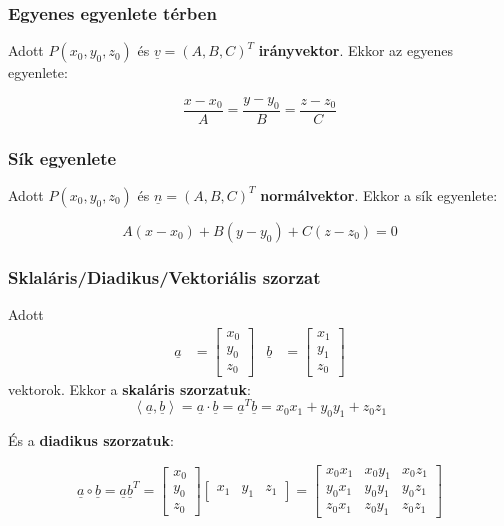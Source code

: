 \documentclass{article}
\begin{document}
\subsubsection{Egyenes egyenlete térben}
    Adott $P(x_0, y_0, z_0)$ és $\underline{v} = \left( A, B, C \right)^T$ \textbf{irányvektor}. Ekkor az egyenes egyenlete:

\begin{equation*}
    \frac{x-x_0}{A} = \frac{y-y_0}{B} = \frac{z-z_0}{C}
\end{equation*}

\subsubsection{Sík egyenlete}
    Adott $P(x_0, y_0, z_0)$ és $\underline{n} = \left( A, B, C \right)^T$ \textbf{normálvektor}. Ekkor a sík egyenlete:

\begin{equation*}
    A(x-x_0) + B(y-y_0) + C(z-z_0) = 0
\end{equation*}

\subsubsection{Sklaláris/Diadikus/Vektoriális szorzat}
Adott 
\begin{align*}
    \underline{a} &= \begin{bmatrix} x_0 \\ y_0 \\ z_0 \end{bmatrix} &
    \underline{b} &= \begin{bmatrix} x_1 \\ y_1 \\ z_0 \end{bmatrix}
\end{align*}
vektorok. Ekkor a \textbf{skaláris szorzatuk}:
\begin{equation*}
    \left\langle \underline{a}, \underline{b} \right\rangle = \underline{a} \cdot \underline{b} = \underline{a}^T\underline{b} = x_0x_1 + y_0y_1 + z_0z_1
\end{equation*}

\newpage

És a \textbf{diadikus szorzatuk}:

\begin{equation*}
    \underline{a} \circ \underline{b} = \underline{a}\underline{b}^T = \begin{bmatrix} x_0 \\ y_0 \\ z_0 \end{bmatrix} \begin{bmatrix} x_1 & y_1 & z_1 \end{bmatrix} = \begin{bmatrix} x_0x_1 & x_0y_1 & x_0z_1 \\ y_0x_1 & y_0y_1 & y_0z_1 \\ z_0x_1 & z_0y_1 & z_0z_1 \end{bmatrix}
\end{equation*}
\end{document}

